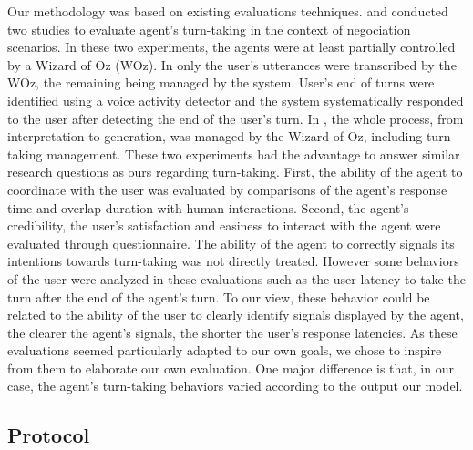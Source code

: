 Our methodology was based on existing evaluations techniques.
\cite{skantze_towards_2010} and \cite{de_vault_toward_2015} conducted two studies to evaluate agent's turn-taking in the context of negociation scenarios. In these two experiments, the agents were at least partially controlled by a Wizard of Oz (WOz). In \cite{skantze_towards_2010} only the user's utterances were transcribed by the WOz, the remaining being managed by the system. User's end of turns were identified using a voice activity detector and the system systematically responded to the user after detecting the end of the user's turn. In \cite{de_vault_toward_2015}, the whole process, from interpretation to generation, was managed by the Wizard of Oz, including turn-taking management. These two experiments had the advantage to answer similar research questions as ours regarding turn-taking. First, the ability of the agent to coordinate with the user was evaluated by comparisons of the agent's response time and overlap duration with human interactions. Second, the agent's credibility, the user's satisfaction and easiness to interact with the agent were evaluated through questionnaire. The ability of the agent to correctly signals its intentions towards turn-taking was not directly treated. However some behaviors of the user were analyzed in these evaluations such as the user latency to take the turn after the end of the agent's turn. To our view, these behavior could be related to the ability of the user to clearly identify signals displayed by the agent, the clearer the agent's signals, the shorter the user's response latencies. As these evaluations seemed particularly adapted to our own goals, we chose to inspire from them to elaborate our own evaluation. One major difference is that, in our case, the agent's turn-taking behaviors varied according to the output our model. 

\subsection{Protocol}

